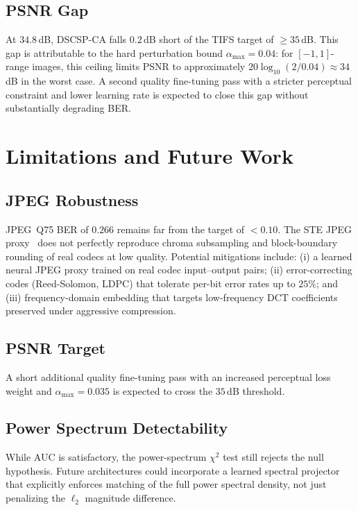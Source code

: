 \documentclass[journal]{IEEEtran}
\begin{document}
\subsection{PSNR Gap}

At $34.8$\,dB, DSCSP-CA falls $0.2$\,dB short of the TIFS target of $\geq\!35$\,dB.
This gap is attributable to the hard perturbation bound $\alpha_\text{max}=0.04$: for
$[-1,1]$-range images, this ceiling limits PSNR to approximately $20\log_{10}(2/0.04)
\approx 34$\,dB in the worst case.
A second quality fine-tuning pass with a stricter perceptual constraint and lower learning
rate is expected to close this gap without substantially degrading BER.


\section{Limitations and Future Work}
\label{sec:limitations}

\subsection{JPEG Robustness}
JPEG~Q75 BER of $0.266$ remains far from the target of $<\!0.10$.
The STE JPEG proxy~\cite{bengio2013estimating,shin2017jpeg} does not perfectly reproduce
chroma subsampling and block-boundary rounding of real codecs at low quality.
Potential mitigations include: (i) a learned neural JPEG proxy trained on real codec
input--output pairs; (ii) error-correcting codes (Reed-Solomon, LDPC) that tolerate
per-bit error rates up to $25\%$; and (iii) frequency-domain embedding that targets
low-frequency DCT coefficients preserved under aggressive compression.

\subsection{PSNR Target}
A short additional quality fine-tuning pass with an increased perceptual loss weight
and $\alpha_\text{max}=0.035$ is expected to cross the $35$\,dB threshold.

\subsection{Power Spectrum Detectability}
While AUC is satisfactory, the power-spectrum $\chi^2$ test still rejects the null
hypothesis.
Future architectures could incorporate a learned spectral projector that explicitly
enforces matching of the full power spectral density, not just penalizing the $\ell_2$
magnitude difference.
\end{document}
